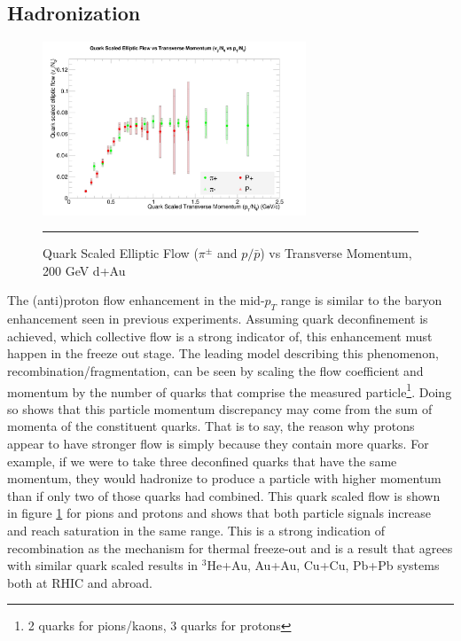 \subsection{Hadronization}
\begin{figure}[hbtp]
\centering    
    \includegraphics[width=0.7\textwidth]{results/v2NqvspT.jpg}
    \rule{35em}{0.5pt}
    \caption[Quark Scaled Elliptic Flow ($\pi^{\pm}$ and $p/\bar{p}$) vs Transverse Momentum, 200 GeV d+Au]{Quark Scaled Elliptic Flow ($\pi^{\pm}$ and $p/\bar{p}$) vs Transverse Momentum, 200 GeV d+Au}
    \label{fig:qscaledv2}
\end{figure}

The (anti)proton flow enhancement in the mid-$p_T$ range is similar to the baryon enhancement seen in previous experiments. Assuming quark deconfinement is achieved, which collective flow is a strong indicator of, this enhancement must happen in the freeze out stage. The leading model describing this phenomenon, recombination/fragmentation, can be seen by scaling the flow coefficient and momentum by the number of quarks that comprise the measured particle\footnote{2 quarks for pions/kaons, 3 quarks for protons}. Doing so shows that this particle momentum discrepancy may come from the sum of momenta of the constituent quarks. That is to say, the reason why protons appear to have stronger flow is simply because they contain more quarks. For example, if we were to take three deconfined quarks that have the same momentum, they would hadronize to produce a particle with higher momentum than if only two of those quarks had combined. This quark scaled flow is shown in figure \ref{fig:qscaledv2} for pions and protons and shows that both particle signals increase and reach saturation in the same range. This is a strong indication of recombination as the mechanism for thermal freeze-out and is a result that agrees with similar quark scaled results in $^3$He+Au\citep{huangQM2015}, Au+Au\citep{Adler:2003kt}, Cu+Cu\citep{PhysRevC.92.034913}, Pb+Pb\citep{Noferini:2012ps} systems both at RHIC and abroad.

